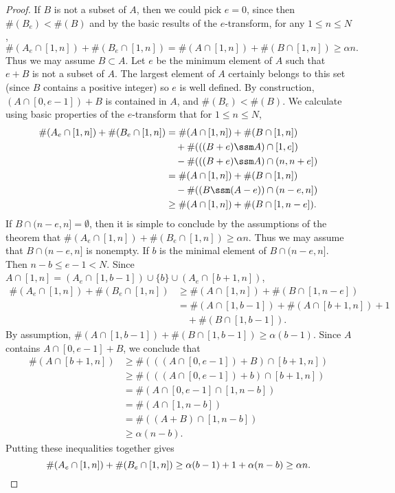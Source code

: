 \begin{proof}
    If $B$ is not a subset of $A$, then we could pick $e = 0$, since then $\#(B_e) < \#(B)$ and by the basic results of the $e$-transform, for any $1 \leq n \leq N$,
    \[ \#(A_e \cap [1,n]) + \#(B_e \cap [1,n]) = \#(A \cap [1,n]) + \#(B \cap [1,n]) \geq \alpha n. \]
    Thus we may assume $B \subset A$. Let $e$ be the minimum element of $A$ such that $e + B$ is not a subset of $A$. The largest element of $A$ certainly belongs to this set (since $B$ contains a positive integer) so $e$ is well defined. By construction, $(A \cap [0,e-1]) + B$ is contained in $A$, and $\#(B_e) < \#(B)$. We calculate using basic properties of the $e$-transform that for $1 \leq n \leq N$,
    \begin{align*}
        \#(A_e \cap [1,n]) + \#(B_e \cap [1,n]) &= \#(A \cap [1,n]) + \#(B \cap [1,n])\\
        &\quad + \#(((B + e) \ssm A) \cap [1,e])\\
        &\quad - \#(((B + e) \ssm A) \cap (n,n+e])\\
        &= \#(A \cap [1,n]) + \#(B \cap [1,n])\\
        &\quad - \#((B \ssm (A - e)) \cap (n-e,n])\\
        &\geq \#(A \cap [1,n]) + \#(B \cap [1,n-e]).
    \end{align*}
    If $B \cap (n-e,n] = \emptyset$, then it is simple to conclude by the assumptions of the theorem that $\#(A_e \cap [1,n]) + \#(B_e \cap [1,n]) \geq \alpha n$. Thus we may assume that $B \cap (n-e,n]$ is nonempty. If $b$ is the minimal element of $B \cap (n-e,n]$. Then $n - b \leq e - 1 < N$. Since $A \cap [1,n] = (A_e \cap [1,b-1]) \cup \{ b \} \cup (A_e \cap [b+1,n])$,
    \begin{align*}
        \#(A_e \cap [1,n]) + \#(B_e \cap [1,n]) &\geq \#(A \cap [1,n]) + \#(B \cap [1,n-e])\\
        &= \#(A \cap [1,b-1]) + \#(A \cap [b+1,n]) + 1\\
        &\quad + \#(B \cap [1,b-1]).
    \end{align*}
    By assumption, $\#(A \cap [1,b-1]) + \#(B \cap [1,b-1]) \geq \alpha (b-1)$. Since $A$ contains $A \cap [0,e-1] + B$, we conclude that
    \begin{align*}
        \#(A \cap [b+1,n]) &\geq \#(((A \cap [0,e-1]) + B) \cap [b+1,n])\\
        &\geq \#(((A \cap [0,e-1]) + b) \cap [b+1,n])\\
        &= \#(A \cap [0,e-1] \cap [1,n-b])\\
        &= \#(A \cap [1,n-b])\\
        &= \#((A + B) \cap [1,n-b])\\
        &\geq \alpha(n-b).
    \end{align*}
    Putting these inequalities together gives
    \[ \#(A_e \cap [1,n]) + \#(B_e \cap [1,n]) \geq \alpha(b-1) + 1 + \alpha(n-b) \geq \alpha n. \qedhere \]
\end{proof}

